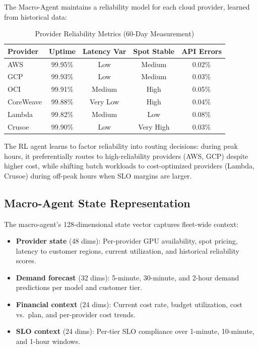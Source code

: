 \documentclass[conference,10pt]{IEEEtran}
\begin{document}
The Macro-Agent maintains a reliability model for each cloud provider, learned from historical data:

\begin{table}[!htbp]
\caption{Provider Reliability Metrics (60-Day Measurement)}
\label{tab:reliability}
\centering\scriptsize
\begin{tabular}{@{}lcccc@{}}
\toprule
\textbf{Provider} & \textbf{Uptime} & \textbf{Latency Var} & \textbf{Spot Stable} & \textbf{API Errors} \\
\midrule
AWS & 99.95\% & Low & Medium & 0.02\% \\
GCP & 99.93\% & Low & Medium & 0.03\% \\
OCI & 99.91\% & Medium & High & 0.05\% \\
CoreWeave & 99.88\% & Very Low & High & 0.04\% \\
Lambda & 99.82\% & Medium & Low & 0.08\% \\
Crusoe & 99.90\% & Low & Very High & 0.03\% \\
\bottomrule
\end{tabular}
\end{table}

The RL agent learns to factor reliability into routing decisions: during peak hours, it preferentially routes to high-reliability providers (AWS, GCP) despite higher cost, while shifting batch workloads to cost-optimized providers (Lambda, Crusoe) during off-peak hours when SLO margins are larger.


\subsection{Macro-Agent State Representation}

The macro-agent's 128-dimensional state vector captures fleet-wide context:
\begin{itemize}
\item \textbf{Provider state} (48 dims): Per-provider GPU availability, spot pricing, latency to customer regions, current utilization, and historical reliability scores.
\item \textbf{Demand forecast} (32 dims): 5-minute, 30-minute, and 2-hour demand predictions per model and customer tier.
\item \textbf{Financial context} (24 dims): Current cost rate, budget utilization, cost vs.\ plan, and per-provider cost trends.
\item \textbf{SLO context} (24 dims): Per-tier SLO compliance over 1-minute, 10-minute, and 1-hour windows.
\end{itemize}
\end{document}
